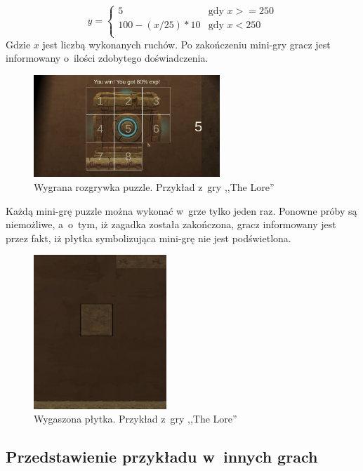 \documentclass[oneside,polski,logo]{amuthesis}
\begin{document}
$$
y = \left\{ \begin{array}{ll}
5 & \textrm{gdy $x>=250$}\\
100 - (x / 25) * 10 & \textrm{gdy $x<250$}\\
\end{array} \right.
$$
Gdzie \(x\) jest liczbą wykonanych ruchów.
Po zakończeniu mini-gry gracz jest informowany o~ilości zdobytego doświadczenia.
\begin{figure}[h]
	\centering
	\includegraphics[width=7cm]{images/tyrek/puzzle_end.png}
	\caption{Wygrana rozgrywka puzzle. Przykład z~gry ,,The Lore''}
\end{figure}

Każdą mini-grę puzzle można wykonać w~grze tylko jeden raz. Ponowne próby są niemożliwe, a~o~tym, iż zagadka została zakończona, gracz informowany jest przez fakt, iż płytka symbolizująca mini-grę nie jest podświetlona.

\begin{figure}[h]
	\centering
	\includegraphics[width=5cm]{images/tyrek/puzzleWin.png}
	\caption{Wygaszona płytka. Przykład z~gry ,,The Lore''}
\end{figure}


\subsection{Przedstawienie przykładu w~innych grach}
\end{document}
